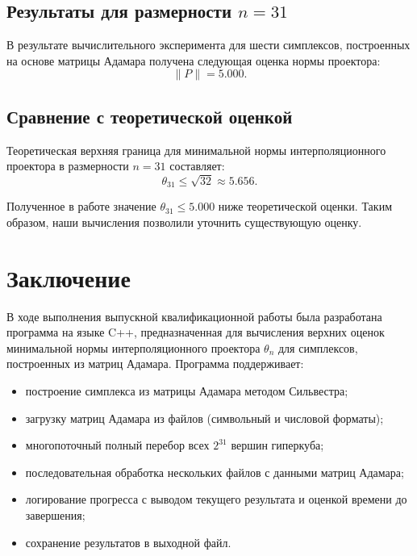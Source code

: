 \documentclass[main]{subfiles}
\begin{document}
\subsection{Результаты для размерности $n = 31$}

В результате вычислительного эксперимента для шести симплексов, построенных на основе матрицы Адамара получена следующая оценка нормы проектора:
\[
\|P\| = 5.000.
\]

\subsection{Сравнение с теоретической оценкой}

Теоретическая верхняя граница для минимальной нормы интерполяционного проектора в размерности $n = 31$ составляет:
\[
\theta_{31} \le \sqrt{32} \approx 5.656.
\]

Полученное в работе значение $\theta_{31} \le 5.000$ ниже теоретической оценки. Таким образом, наши вычисления позволили уточнить существующую оценку.

\newpage

\section*{Заключение}

В ходе выполнения выпускной квалификационной работы была разработана программа на языке C++, предназначенная для вычисления верхних оценок минимальной нормы интерполяционного проектора $\theta_n$ для симплексов, построенных из матриц Адамара. Программа поддерживает:

\begin{itemize}
    \item построение симплекса из матрицы Адамара методом Сильвестра;
    \item загрузку матриц Адамара из файлов (символьный и числовой форматы);
    \item многопоточный полный перебор всех $2^{31}$ вершин гиперкуба;
    \item последовательная обработка нескольких файлов с данными матриц Адамара;
    \item логирование прогресса с выводом текущего результата и оценкой времени до завершения;
    \item сохранение результатов в выходной файл.
\end{itemize}
\end{document}
